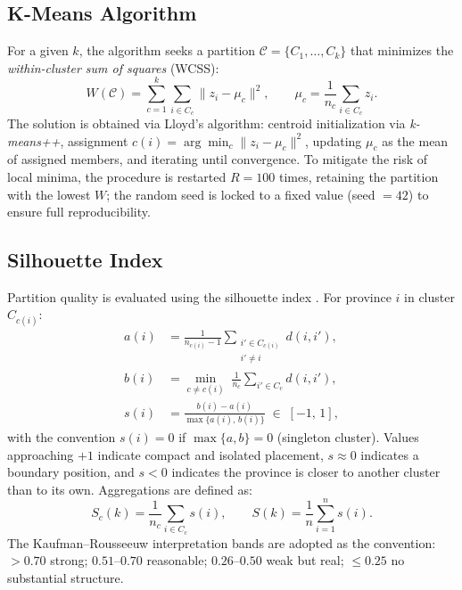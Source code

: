 \documentclass[11pt,a4paper]{article}
\begin{document}
\subsection{K-Means Algorithm}
For a given $k$, the algorithm seeks a partition $\mathcal{C} = \{C_1,\dots,C_k\}$ that minimizes the \emph{within-cluster sum of squares} (WCSS):
\begin{equation}
W(\mathcal{C}) = \sum_{c=1}^{k} \sum_{i \in C_c} \bigl\| z_i - \mu_c \bigr\|^2,
\qquad \mu_c = \frac{1}{n_c}\sum_{i \in C_c} z_i.
\label{eq:wcss}
\end{equation}
The solution is obtained via Lloyd's algorithm: centroid initialization via \emph{k-means++}, assignment $c(i) = \arg\min_c \|z_i - \mu_c\|^2$, updating $\mu_c$ as the mean of assigned members, and iterating until convergence. To mitigate the risk of local minima, the procedure is restarted $R = 100$ times, retaining the partition with the lowest $W$; the random seed is locked to a fixed value (seed $= 42$) to ensure full reproducibility.

\subsection{Silhouette Index}
Partition quality is evaluated using the silhouette index \cite{rousseeuw1987}. For province $i$ in cluster $C_{c(i)}$:
\begin{align}
a(i) &= \frac{1}{n_{c(i)}-1}\sum_{\substack{i' \in C_{c(i)}\\ i'\ne i}} d(i,i'),
\label{eq:a}\\[4pt]
b(i) &= \min_{c \ne c(i)}\; \frac{1}{n_c}\sum_{i' \in C_c} d(i,i'),
\label{eq:b}\\[4pt]
s(i) &= \frac{b(i)-a(i)}{\max\{a(i),\,b(i)\}} \;\in\; [-1,\,1],
\label{eq:si}
\end{align}
with the convention $s(i) = 0$ if $\max\{a,b\} = 0$ (singleton cluster). Values approaching $+1$ indicate compact and isolated placement, $s \approx 0$ indicates a boundary position, and $s < 0$ indicates the province is closer to another cluster than to its own. Aggregations are defined as:
\begin{equation}
S_c(k) = \frac{1}{n_c}\sum_{i \in C_c} s(i), \qquad
S(k)   = \frac{1}{n}\sum_{i=1}^{n} s(i).
\label{eq:S}
\end{equation}
The Kaufman--Rousseeuw interpretation bands \cite{kaufman2009} are adopted as the convention: $> 0.70$ strong; $0.51$--$0.70$ reasonable; $0.26$--$0.50$ weak but real; $\le 0.25$ no substantial structure.
\end{document}
